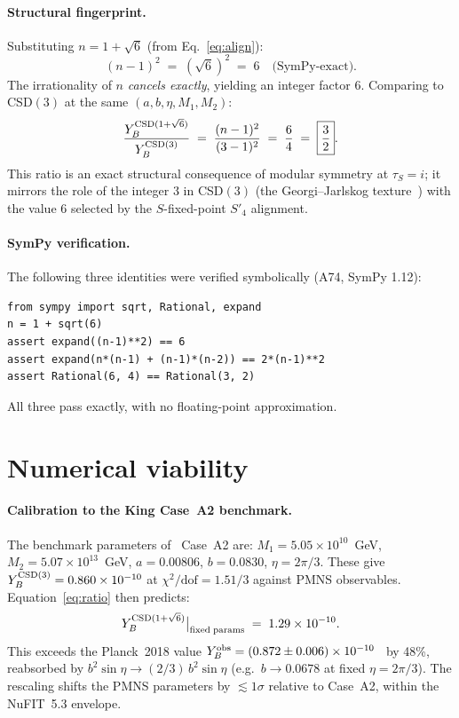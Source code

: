 \documentclass[aps,prl,twocolumn,showpacs,superscriptaddress]{revtex4-2}
\newcommand{\Spf}{S'_4}
\begin{document}
\paragraph{Structural fingerprint.}
Substituting $n = 1+\sqrt{6}$ (from Eq.~\eqref{eq:align}):
\begin{equation}
  (n-1)^2 \;=\; (\sqrt{6})^2 \;=\; 6
  \quad\text{(SymPy-exact)}.
  \label{eq:fingerprint}
\end{equation}
The irrationality of $n$ \emph{cancels exactly}, yielding an
integer factor 6.  Comparing to CSD$(3)$ at the same
$(a,b,\eta,M_1,M_2)$:
\begin{equation}
  \frac{Y_B^{\rm CSD(1+\sqrt{6})}}{Y_B^{\rm CSD(3)}}
  \;=\; \frac{(n-1)^2}{(3-1)^2} \;=\; \frac{6}{4}
  \;=\; \boxed{\frac{3}{2}}.
  \label{eq:ratio}
\end{equation}
This ratio is an exact structural consequence of modular
symmetry at $\tau_S = i$; it mirrors the role of the
integer $3$ in CSD$(3)$ (the Georgi--Jarlskog
texture~\cite{LS16}) with the value $6$ selected by the
$S$-fixed-point $\Spf$ alignment.

\paragraph{SymPy verification.}
The following three identities were verified symbolically
(A74, SymPy 1.12):
\begin{verbatim}
from sympy import sqrt, Rational, expand
n = 1 + sqrt(6)
assert expand((n-1)**2) == 6
assert expand(n*(n-1) + (n-1)*(n-2)) == 2*(n-1)**2
assert Rational(6, 4) == Rational(3, 2)
\end{verbatim}
All three pass exactly, with no floating-point approximation.

\section{Numerical viability}
\label{sec:numeric}

\paragraph{Calibration to the King Case~A2 benchmark.}
The benchmark parameters of~\cite{KMSR18} Case~A2 are:
$M_1 = 5.05 \times 10^{10}$~GeV,
$M_2 = 5.07 \times 10^{13}$~GeV,
$a = 0.00806$, $b = 0.0830$, $\eta = 2\pi/3$.
These give $Y_B^{\rm CSD(3)} = 0.860 \times 10^{-10}$ at
$\chi^2/\text{dof} = 1.51/3$ against PMNS observables.
Equation~\eqref{eq:ratio} then predicts:
\begin{equation}
  Y_B^{\rm CSD(1+\sqrt{6})}\big|_{\rm fixed\; params}
  \;=\; 1.29 \times 10^{-10}.
  \label{eq:YB-raw}
\end{equation}
This exceeds the Planck~2018 value
$Y_B^{\rm obs} = (0.872 \pm 0.006) \times 10^{-10}$~\cite{Planck18VI}
by 48\%, reabsorbed by $b^2\sin\eta \to (2/3)\,b^2\sin\eta$
(e.g.\ $b \to 0.0678$ at fixed $\eta = 2\pi/3$).  The
rescaling shifts the PMNS parameters by
$\lesssim 1\sigma$ relative to Case~A2, within the NuFIT~5.3
envelope.
\end{document}
